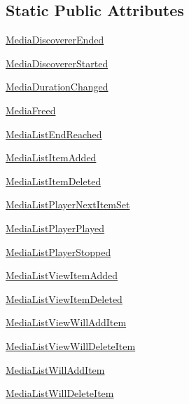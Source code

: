 \subsection*{Static Public Attributes}
\begin{DoxyCompactItemize}
\item 
\hyperlink{classvlc_1_1_event_type_a55b3401d66f9de6982902c2305702e5d}{Media\+Discoverer\+Ended}
\item 
\hyperlink{classvlc_1_1_event_type_af59a66ead6958527bb0a186332b4e071}{Media\+Discoverer\+Started}
\item 
\hyperlink{classvlc_1_1_event_type_aab8952e55cbf79b183114e66385de089}{Media\+Duration\+Changed}
\item 
\hyperlink{classvlc_1_1_event_type_a8bb72067eb1b6aab8def844a24852123}{Media\+Freed}
\item 
\hyperlink{classvlc_1_1_event_type_a04f919f2d2d7969e56d9d752c3aab78c}{Media\+List\+End\+Reached}
\item 
\hyperlink{classvlc_1_1_event_type_a08a4109270a0ef17d287db7a7935ae47}{Media\+List\+Item\+Added}
\item 
\hyperlink{classvlc_1_1_event_type_a1617074d6f887685093dbb0684d8419a}{Media\+List\+Item\+Deleted}
\item 
\hyperlink{classvlc_1_1_event_type_a2dc79d553dc216016f8d3ba88060f34f}{Media\+List\+Player\+Next\+Item\+Set}
\item 
\hyperlink{classvlc_1_1_event_type_a6a070ea82d6c3ebb9cd8964cdcde73b9}{Media\+List\+Player\+Played}
\item 
\hyperlink{classvlc_1_1_event_type_abcc2921e86af123c99f2af72a09b2d44}{Media\+List\+Player\+Stopped}
\item 
\hyperlink{classvlc_1_1_event_type_ab22fdd3bf2f94e3ad7b263fde0021dda}{Media\+List\+View\+Item\+Added}
\item 
\hyperlink{classvlc_1_1_event_type_a42c9cb3ab2132571cfcbc74dcabb2fd1}{Media\+List\+View\+Item\+Deleted}
\item 
\hyperlink{classvlc_1_1_event_type_abbaafa43af9985cc9dbabcaebb5dbb34}{Media\+List\+View\+Will\+Add\+Item}
\item 
\hyperlink{classvlc_1_1_event_type_a61f697ea4041c6e2138e5460227c681e}{Media\+List\+View\+Will\+Delete\+Item}
\item 
\hyperlink{classvlc_1_1_event_type_af99fe11a32bfd81458d2cc67c5663a61}{Media\+List\+Will\+Add\+Item}
\item 
\hyperlink{classvlc_1_1_event_type_ae560f3602e130a76b9ecf3a253eab0f9}{Media\+List\+Will\+Delete\+Item}

\end{DoxyCompactItemize}
